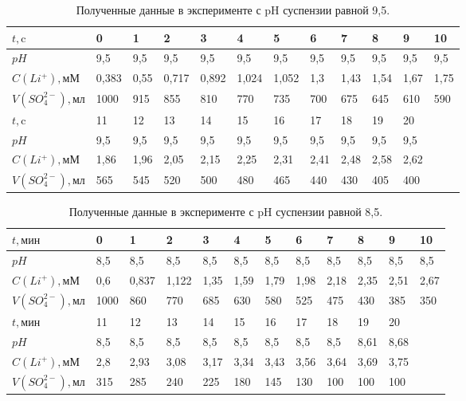 \documentclass[a4paper,12pt]{article} %
\begin{document}
\begin{table}[H]
    \centering
    \begin{tabular}{|l|l|l|l|l|l|l|l|l|l|l|l|}
    \hline
        $t, \textrm{c}$& 0 & 1 & 2 & 3 & 4 & 5 & 6 & 7 & 8 & 9 & 10  \\ \hline
        $pH$ & 9,5 & 9,5 & 9,5 & 9,5 & 9,5 & 9,5 & 9,5 & 9,5 & 9,5 & 9,5 & 9,5  \\ \hline
        $C(Li^{+}), \textrm{мМ}$ & 0,383 & 0,55 & 0,717 & 0,892 & 1,024 & 1,052 & 1,3 & 1,43 & 1,54 & 1,67 & 1,75  \\ \hline
        $V(SO_4^{2-}), \textrm{мл}$ & 1000 & 915 & 855 & 810 & 770 & 735 & 700 & 675 & 645 & 610 & 590 \\ \hline
        $t, \textrm{c}$& 11 & 12 & 13 & 14 & 15 & 16 & 17 & 18 & 19 & 20 &\\ \hline
        $pH$ & 9,5 & 9,5 & 9,5 & 9,5 & 9,5 & 9,5 & 9,5 & 9,5 & 9,5 & 9,5 &   \\ \hline
        $C(Li^{+}), \textrm{мМ}$ & 1,86 & 1,96 & 2,05 & 2,15 & 2,25 & 2,31 & 2,41 & 2,48 & 2,58 & 2,62 & \\ \hline
        $V(SO_4^{2-}), \textrm{мл}$ & 565 & 545 & 520 & 500 & 480 & 465 & 440 & 430 & 405 & 400 & \\ \hline
    \end{tabular}
    \caption{Полученные данные в эксперименте с pH суспензии равной 9,5.}
	\label{tab:1}
\end{table}

\begin{table}[H]
    \centering
    \begin{tabular}{|l|l|l|l|l|l|l|l|l|l|l|l|}
    \hline
          $t, \textrm{мин}$& 0 & 1 & 2 & 3 & 4 & 5 & 6 & 7 & 8 & 9 & 10  \\ \hline
          $pH$ & 8,5 & 8,5 & 8,5 & 8,5 & 8,5 & 8,5 & 8,5 & 8,5 & 8,5 & 8,5 & 8,5  \\ \hline
       $C(Li^{+}), \textrm{мМ}$ & 0,6 & 0,837 & 1,122 & 1,35 & 1,59 & 1,79 & 1,98 & 2,18 & 2,35 & 2,51 & 2,67 \\ \hline
        $V(SO_4^{2-}), \textrm{мл}$ & 1000 & 860 & 770 & 685 & 630 & 580 & 525 & 475 & 430 & 385 & 350 \\ \hline
        $t, \textrm{мин}$&  11 & 12 & 13 & 14 & 15 & 16 & 17 & 18 & 19 & 20 & \\ \hline
         $pH$ & 8,5 & 8,5 & 8,5 & 8,5 & 8,5 & 8,5 & 8,5 & 8,5 & 8,61 & 8,68 &   \\ \hline
       $C(Li^{+}), \textrm{мМ}$  & 2,8 & 2,93 & 3,08 & 3,17 & 3,34 & 3,43 & 3,56 & 3,64 & 3,69 & 3,75 &\\ \hline
        $V(SO_4^{2-}), \textrm{мл}$  & 315 & 285 & 240 & 225 & 180 & 145 & 130 & 100 & 100 & 100 & \\ \hline
    \end{tabular}
    \caption{Полученные данные в эксперименте с pH суспензии равной 8,5.}
	\label{tab:2}
\end{table}
\end{document}
